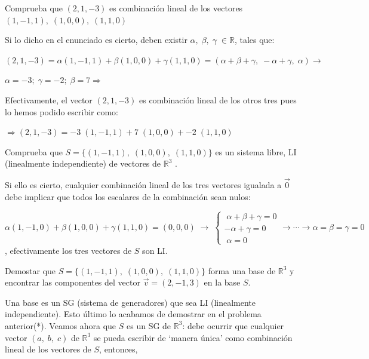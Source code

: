 \begin{miejercicio}

Comprueba que $(2,1,-3)$ es combinación lineal de los vectores $	(1,-1,1),\; (1,0,0),\; (1,1,0)$
\end{miejercicio}


Si lo dicho en el enunciado es cierto, deben existir $\alpha, \; \beta, \; \gamma \; \in \mathbb R$, tales que:

\noindent $(2,1,-3)=\alpha (1,-1,1)+  \beta (1,0,0)+ \gamma (1,1,0)=(\alpha+\beta+\gamma, \; -\alpha+\gamma,\; \alpha) \to$

\noindent $\alpha=-3; \; \gamma=-2; \; \beta=7 \Rightarrow $


\noindent Efectivamente, el vector $(2,1,-3)$ es combinación lineal de los otros tres pues lo hemos podido escribir como:

\noindent $ \Rightarrow (2,1,-3)=\boxed{-3}\;  (1,-1,1)+  \boxed{7}\;  (1,0,0)+ \boxed{-2}\;  (1,1,0)$



\begin{miejercicio}

Comprueba que $S=\{ (1,-1,1),\; (1,0,0),\; (1,1,0) \}$ es un sistema libre, LI (linealmente independiente) de vectores de $\mathbb R^3$	.
\end{miejercicio}


	Si ello es cierto, cualquier combinación lineal de los tres vectores igualada a $\vec 0$ debe implicar que todos los escalares de la combinación sean nulos:

\noindent $\alpha (1,-1,0)+\beta (1,0,0) +\gamma (1,1,0)=(0,0,0) \; \to \; \begin{cases}  \; \alpha+\beta+\gamma=0\\ -\alpha+\gamma=0\\ \; \alpha=0 \end{cases} \rightarrow \cdots \to \alpha=\beta=\gamma=0$, efectivamente los tres vectores de $S$ son LI.
	

\begin{miejercicio}
	
Demostar que $S=\{ (1,-1,1),\; (1,0,0),\; (1,1,0) \}$ forma una base de $\mathbb R^3$ y encontrar las componentes del vector $\vec v=(2,-1,3)$ en la base $S$.
\end{miejercicio}


	Una base es un SG (sistema de generadores) que sea LI (linealmente independiente). Esto último lo acabamos de demostrar en el problema anterior(*). Veamos ahora que $S$ es un SG de $\mathbb R^3$: debe ocurrir que cualquier vector $(a, \; b, \; c)$ de $\mathbb R^3$ se pueda escribir de `manera única' como combinación lineal de los vectores de $S$, entonces,

